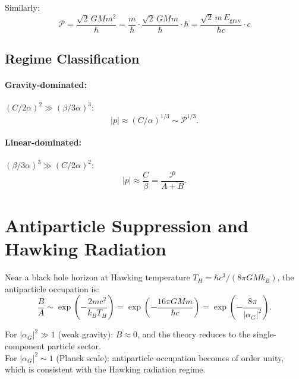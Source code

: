 \documentclass[11pt,a4paper]{article}
\theoremstyle{definition}
\theoremstyle{remark}
\begin{document}
	Similarly:
	\begin{equation}
		\mathcal{P} = \frac{\sqrt{2}\,GMm^2}{\hbar} = \frac{m}{\hbar}\cdot\frac{\sqrt{2}\,GMm}{\hbar} \cdot \hbar
		= \frac{\sqrt{2}\,m\,E_{\mathrm{grav}}}{\hbar c}\cdot c
	\end{equation}
	
	\subsection{Regime Classification}
	
	\paragraph{Gravity-dominated:} $(C/2\alpha)^2\gg(\beta/3\alpha)^3$:
	\begin{equation}
		|p| \approx (C/\alpha)^{1/3} \sim \mathcal{P}^{1/3}.
	\end{equation}
	
	\paragraph{Linear-dominated:} $(\beta/3\alpha)^3\gg(C/2\alpha)^2$:
	\begin{equation}
		|p| \approx \frac{C}{\beta} = \frac{\mathcal{P}}{A+B}.
	\end{equation}
	
	\section{Antiparticle Suppression and Hawking Radiation}
	
	Near a black hole horizon at Hawking temperature $T_H=\hbar c^3/(8\pi GMk_B)$, the antiparticle occupation is:
	\begin{equation}
		\frac{B}{A} \sim \exp\!\left(-\frac{2mc^2}{k_BT_H}\right) = \exp\!\left(-\frac{16\pi GMm}{\hbar c}\right) = \exp\!\left(-\frac{8\pi}{|\alpha_G|^2}\right).
	\end{equation}
	
	For $|\alpha_G|^2\gg1$ (weak gravity): $B\approx0$, and the theory reduces to the single-component particle sector.\\
	For $|\alpha_G|^2\sim1$ (Planck scale): antiparticle occupation becomes of order unity, which is consistent with the Hawking radiation regime.
	
\end{document}
